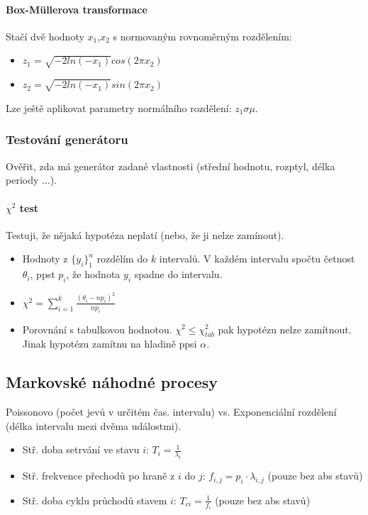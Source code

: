 \documentclass[11pt,a4paper]{scrartcl}
\begin{document}
	\paragraph{Box-Müllerova transformace}
	Stačí dvě hodnoty $x_1$,$x_2$ s normovaným rovnoměrným rozdělením: 
	\begin{itemize}
		\item $z_1 = \sqrt{-2ln(-x_1)}cos(2\pi x_2)$
		\item $z_2 = \sqrt{-2ln(-x_1)}sin(2\pi x_2)$
	\end{itemize}
    
    Lze ještě aplikovat parametry normálního rozdělení: $z_1 \sigma \mu $.
	
	\subsubsection{Testování generátoru} 
	Ověřit, zda má generátor zadané vlastnosti (střední hodnotu, rozptyl, délka periody ...).
	
	\paragraph{$\chi^2$ test} Testuji, že nějaká hypotéza neplatí (nebo, že ji nelze zamínout). 
	
	\begin{itemize}
\item 	Hodnoty z $\{y_i\}_1^n$ rozdělím do $k$ intervalů. V každém intervalu spočtu četnost $\theta_i$, ppst $p_i$, že hodnota $y_i$ spadne do intervalu. 

\item  $\chi^2=\sum_{i=1}^{k} \frac{(\theta_i - np_i)^2}{np_i}$
\item Porovnání s tabulkovou hodnotou. $\chi^2 \le \chi_{tab}^2$ pak hypotézu nelze zamítnout. Jinak hypotézu zamítnu na hladině ppsi $\alpha$.
	\end{itemize}
	
	\subsection{Markovské náhodné procesy}
	Poissonovo (počet jevů v určitém čas. intervalu) vs. Exponenciální rozdělení (délka intervalu mezi dvěma událostmi).
	
	\begin{itemize}
		\item Stř. doba setrvání ve stavu $i$: $T_i=\frac{1}{\lambda_i}$
		\item Stř. frekvence přechodů po hraně z $i$ do $j$: $f_{i,j}=p_i\cdot\lambda_{i,j}$ (pouze bez abs stavů)
		\item Stř. doba cyklu průchodů stavem $i$: $T_{ci} = \frac{1}{f_i}$ (pouze bez abs stavů)
	\end{itemize}
	
\end{document}
